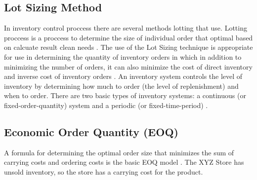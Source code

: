 \documentclass[12pt,a4paper,final]{iopart}
\begin{document}
\subsection{Lot Sizing Method}

In inventory control proccess there are several methods lotting that use. Lotting proccess is a proccess to determine the size of individual order that optimal based on calcuate result clean needs \cite{Ibrahim}. The use of the Lot Sizing technique is appropriate for use in determining the quantity of inventory orders in which in addition to minimizing the number of orders, it can also minimize the cost of direct inventory and inverse cost of inventory orders \cite{Djunaidi2019}. An inventory system controls the level of inventory by determining how much to order (the level of replenishment) and when to order. There are two basic types of inventory systems: a continuous (or fixed-order-quantity) system and a periodic (or fixed-time-period) \cite{Rusell2011}. 



\subsection{Economic Order Quantity (EOQ)}
A formula for determining the optimal order size that minimizes the sum of carrying costs and ordering costs is the basic EOQ model \cite{Rusell2011}. The XYZ Store has unsold inventory, so the store has a carrying cost for the product.
\end{document}
